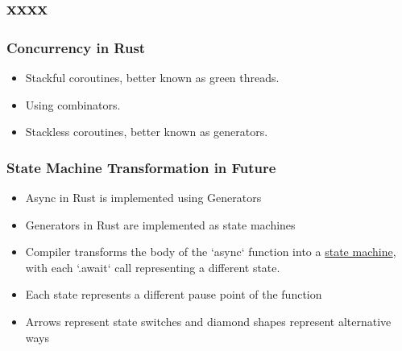 \subsection{xxxx} %
\begin{frame}[fragile]
    \frametitle{Concurrency in Rust}
% 
% 
% 
% 
    \begin{itemize}
        \item Stackful coroutines, better known as green threads.
        \item Using combinators.
        \item Stackless coroutines, better known as generators.
    \end{itemize}
% 
\end{frame}
\begin{frame}[fragile]
    \frametitle{State Machine Transformation in Future}
% 
% 
    \begin{itemize}
        \item Async in Rust is implemented using Generators
        \item Generators in Rust are implemented as state machines
        \item Compiler transforms the body of the `async` function into a \href{https://en.wikipedia.org/wiki/Finite-state_machine}{state machine}, with each `.await` call representing a different state.
        \item Each state represents a different pause point of the function
% 
% 
        \item Arrows represent state switches and diamond shapes represent alternative ways
% 
    \end{itemize}
% 
\end{frame}
